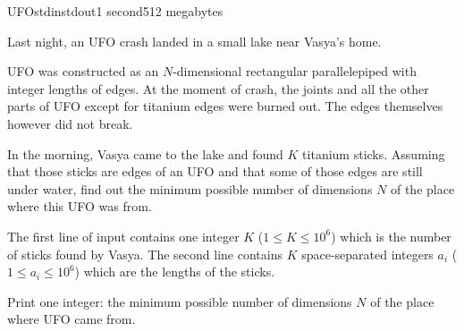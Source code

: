 \begin{problem}{UFO}{stdin}{stdout}{1 second}{512 megabytes}

Last night, an UFO crash landed in a small lake near Vasya's home. 

UFO was constructed as an $N$-dimensional rectangular parallelepiped with integer lengths of edges.
At the moment of crash, the joints and all the other parts of UFO except for titanium edges were burned out.
The edges themselves however did not break.

In the morning, Vasya came to the lake and found $K$ titanium sticks.
Assuming that those sticks are edges of an UFO and that some of those edges are still under water, find out the minimum possible number of dimensions $N$ of the place where this UFO was from.

\InputFile
The first line of input contains one integer $K$ ($1 \le K \le 10^6$) which is the number of sticks found by Vasya.
The second line contains $K$ space-separated integers $a_i$ ($1 \le a_i \le 10^6$) which are the lengths of the sticks.

\OutputFile
Print one integer: the minimum possible number of dimensions $N$ of the place where UFO came from.

\Examples

\begin{example}
%
%
\end{example}

\end{problem}
